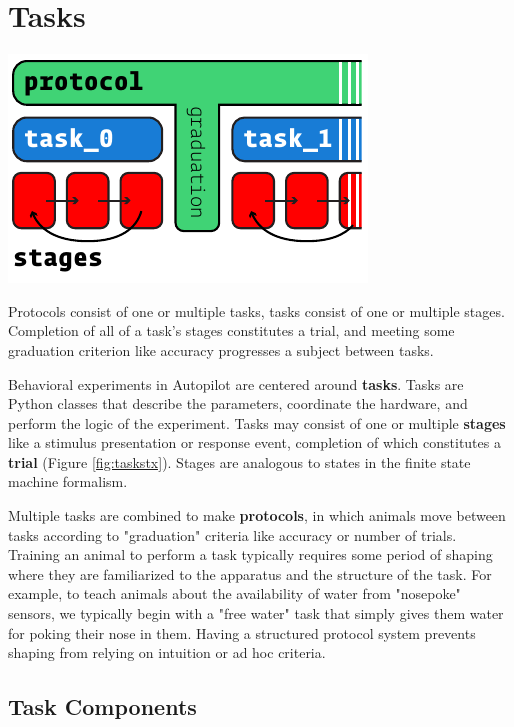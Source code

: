 \section{Tasks}
\label{sec:tasks}
\begin{marginfigure}[0cm]
\includegraphics[]{figures/side_17_protocol.pdf}
\caption{Protocols consist of one or multiple tasks, tasks consist of one or multiple stages. Completion of all of a task's stages constitutes a trial, and meeting some graduation criterion like accuracy progresses a subject between tasks.}
\label{fig:taskstx}
\end{marginfigure}

Behavioral experiments in Autopilot are centered around \textbf{tasks}. Tasks are Python classes that describe the parameters, coordinate the hardware, and perform the logic of the experiment. Tasks may consist of one or multiple \textbf{stages} like a stimulus presentation or response event, completion of which constitutes a \textbf{trial} (Figure \ref{fig:taskstx}). Stages are analogous to states in the finite state machine formalism. 

Multiple tasks are combined to make \textbf{protocols}, in which animals move between tasks according to "graduation" criteria like accuracy or number of trials. Training an animal to perform a task typically requires some period of shaping where they are familiarized to the apparatus and the structure of the task. For example, to teach animals about the availability of water from "nosepoke" sensors, we typically begin with a "free water" task that simply gives them water for poking their nose in them. Having a structured protocol system prevents shaping from relying on intuition or ad hoc criteria.


\subsection{Task Components}
\label{sec:taskcomponents}

